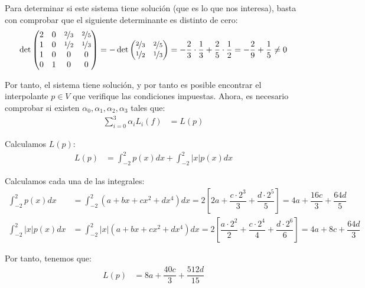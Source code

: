 \begin{ejercicio}
    Para determinar si este sistema tiene solución (que es lo que nos interesa), basta con comprobar que el siguiente determinante es distinto de cero:
    \begin{equation*}
        \det\begin{pmatrix}
            2 & 0 & \nicefrac{2}{3} & \nicefrac{2}{5}\\
            1 & 0 & \nicefrac{1}{2} & \nicefrac{1}{3}\\
            1 & 0 & 0 & 0\\
            0 & 1 & 0 & 0
        \end{pmatrix} = -\det\begin{pmatrix}
            \nicefrac{2}{3} & \nicefrac{2}{5}\\
            \nicefrac{1}{2} & \nicefrac{1}{3}
        \end{pmatrix} = -\dfrac{2}{3}\cdot \dfrac{1}{3} + \dfrac{2}{5}\cdot \dfrac{1}{2} = -\dfrac{2}{9} + \dfrac{1}{5}\neq 0
    \end{equation*}

    Por tanto, el sistema tiene solución, y por tanto es posible encontrar el interpolante $p\in V$ que verifique las condiciones impuestas. Ahora, es necesario comprobar si existen $\alpha_0, \alpha_1, \alpha_2, \alpha_3$ tales que:
    \begin{align*}
        \sum_{i=0}^{3} \alpha_i L_i(f) &= L(p)
    \end{align*}

    Calculamos $L(p)$:
    \begin{align*}
        L(p) &= \int_{-2}^{2} p(x)dx + \int_{-2}^{2} |x|p(x)dx
    \end{align*}

    Calculamos cada una de las integrales:
    \begin{align*}
        \int_{-2}^{2} p(x)dx &= \int_{-2}^{2} (a + bx + cx^2 + dx^4)dx = 2\left[2a+ \dfrac{c\cdot 2^3}{3} + \dfrac{d\cdot 2^5}{5}\right]
        = 4a + \dfrac{16c}{3} + \dfrac{64d}{5}
        \\
        \int_{-2}^{2} |x|p(x)dx &= \int_{-2}^{2} |x|(a + bx + cx^2 + dx^4)dx = 2\left[\dfrac{a\cdot 2^2}{2} + \dfrac{c\cdot 2^4}{4} + \dfrac{d\cdot 2^6}{6}\right]
        = 4a + 8c + \dfrac{64d}{3}
    \end{align*}

    Por tanto, tenemos que:
    \begin{align*}
        L(p) &= 8a + \dfrac{40c}{3} + \dfrac{512d}{15}
    \end{align*}


\end{ejercicio}
